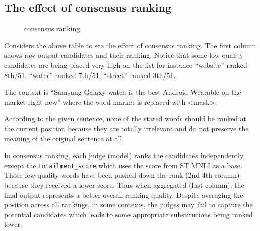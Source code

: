 \documentclass[12pt,oneside,openright,a4paper]{cpe-english-project}
\begin{document}
\subsection{The effect of consensus ranking}
\begin{figure}[h]\centering
\setlength{\fboxrule}{0.2mm} %
\setlength{\fboxsep}{1cm}
\caption{consensus ranking}\label{fig:consensus ranking}
\end{figure}
Considers the above table to see the effect of consensus ranking. The first column shows raw output candidates and their ranking. Notice that some low-quality candidates are being placed very high on the list for instance “website” ranked 8th/51, “water” ranked 7th/51, “street” ranked 3th/51. 

The context is “Samsung Galaxy watch is the best Android Wearable on the market right now” where the word market is replaced with <mask>. 

According to the given sentence, none of the stated words should be ranked at the current position because they are totally irrelevant and do not preserve the meaning of the original sentence at all.



In consensus ranking, each judge (model) ranks the candidates independently, except the \verb/Entailment_score/ which uses the score from ST MNLI as a base. Those low-quality words have been pushed down the rank (2nd-4th column) because they received a lower score. Thus when aggregated (last column), the final output represents a better overall ranking quality. Despite averaging the position across all rankings, in some contexts, the judges may fail to capture the potential candidates which leads to some appropriate substitutions being ranked lower.
\end{document}
